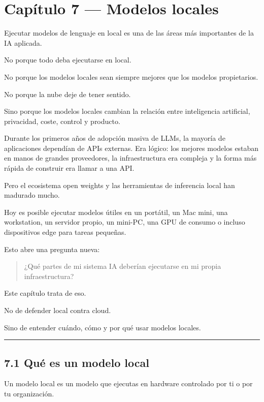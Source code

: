 \newpage

\chapter{Capítulo 7 --- Modelos
locales}\label{capuxedtulo-7-modelos-locales}

Ejecutar modelos de lenguaje en local es una de las áreas más
importantes de la IA aplicada.

No porque todo deba ejecutarse en local.

No porque los modelos locales sean siempre mejores que los modelos
propietarios.

No porque la nube deje de tener sentido.

Sino porque los modelos locales cambian la relación entre inteligencia
artificial, privacidad, coste, control y producto.

Durante los primeros años de adopción masiva de LLMs, la mayoría de
aplicaciones dependían de APIs externas. Era lógico: los mejores modelos
estaban en manos de grandes proveedores, la infraestructura era compleja
y la forma más rápida de construir era llamar a una API.

Pero el ecosistema open weights y las herramientas de inferencia local
han madurado mucho.

Hoy es posible ejecutar modelos útiles en un portátil, un Mac mini, una
workstation, un servidor propio, un mini-PC, una GPU de consumo o
incluso dispositivos edge para tareas pequeñas.

Esto abre una pregunta nueva:

\begin{quote}
¿Qué partes de mi sistema IA deberían ejecutarse en mi propia
infraestructura?
\end{quote}

Este capítulo trata de eso.

No de defender local contra cloud.

Sino de entender cuándo, cómo y por qué usar modelos locales.

\begin{center}\rule{0.5\linewidth}{0.5pt}\end{center}

\section{7.1 Qué es un modelo local}\label{quuxe9-es-un-modelo-local}

Un modelo local es un modelo que ejecutas en hardware controlado por ti
o por tu organización.

